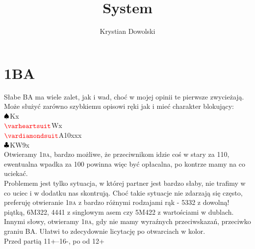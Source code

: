 \documentclass[11pt,a4paper,oneside]{report}
\title{System}
\author{Krystian Dowolski}
\newcommand*\Hs[1]{\ensuremath{{\color{blue} #1}{\color{red}\varheartsuit}}}
\newcommand*\Ss[1]{\ensuremath{{\color{blue} #1}{\color{black}\spadesuit}}}
\newcommand*\Ds[1]{\ensuremath{{\color{blue} #1}{\color{red}\vardiamondsuit}}}
\newcommand*\Cs[1]{\ensuremath{{\color{blue} #1}{\color{black}\clubsuit}}}
\newcommand*\NT[1]{{\color{blue} #1}{\color{black}\textsc{ba}}}
\newcommand{\tab}{\hspace*{15em}}
\newcommand*\Hand[4]{\\\tab\Ss{}#1\\\tab\Hs{}#2\\\tab\Ds{}#3\\\tab\Cs{}#4\\}
\begin{document}
\maketitle
\section*{1BA}
Słabe BA ma wiele zalet, jak i wad, choć w mojej opinii te pierwsze zwycieżają.
Może służyć zarówno szybkiemu opisowi ręki jak i mieć charakter blokujący:
\Hand{Kx}{Wx}{A10xxx}{KW9x}
Otwieramy \NT{1}, bardzo możliwe, że przeciwnikom idzie coś w stary za 110,
ewentualna wpadka za 100 powinna więc być opłacalna, po kontrze mamy na co uciekać.\\
Problemem jest tylko sytuacja, w której partner jest bardzo słaby, nie trafimy w co uciec
i w dodatku nas skontrują. Choć takie sytuacje nie zdarzają się często, preferuję
otwieranie \NT{1} z bardzo różnymi rodzajami rąk - 5332 z dowolną! piątką, 6M322, 4441
z singlowym asem czy 5M422 z wartościami w dublach. Innymi słowy, otwieramy \NT{1}, gdy
nie mamy wyraźnych przeciwskazań, przeciwko graniu BA. Ułatwi to zdecydownie licytację
po otwarciach w kolor.\\
Przed partią 11+--16-, po od 12+\\
\end{document}
